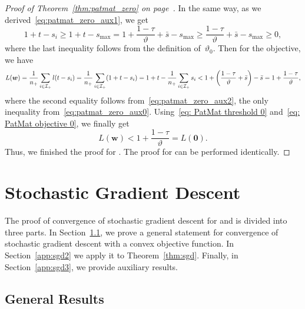 \begin{proof}[Proof of Theorem~\ref{thm:patmat_zero} on page~\pageref{thm:patmat_zero}]
  In the same way, as we derived~\eqref{eq:patmat_zero_aux1}, we get
  \begin{equation}\label{eq:patmat_zero_aux2}
    1 + t - s_i
    \geq 1 + t-s_{\max}
    =   1 + \frac{1-\tau}{\vartheta} + \bar{s} - s_{\max}
    \geq \frac{1-\tau}{\vartheta} + \bar{s} - s_{\max}
    \geq 0,
  \end{equation}
  where the last inequality follows from the definition of~$\vartheta_0$. Then for the objective, we have
  \begin{equation*}
    L(\bm{w})
      = \frac{1}{\npos}\sum_{i \in \Ipos}l(t-s_i)
      = \frac{1}{\npos}\sum_{i \in \Ipos}\Brac{1+t-s_i}
      = 1 + t - \frac{1}{\npos}\sum_{i \in \Ipos} s_i
      < 1 + \Brac{\frac{1 - \tau}{\vartheta} + \bar{s}} - \bar{s}
      = 1 + \frac{1-\tau}{\vartheta},  
  \end{equation*}
  where the second equality follows from~\eqref{eq:patmat_zero_aux2}, the only inequality from~\eqref{eq:patmat_zero_aux0}. Using~\eqref{eq: PatMat threshold 0} and~\eqref{eq: PatMat objective 0}, we finally get
  \begin{equation*}
    L(\bm{w})
      < 1 + \frac{1-\tau}{\vartheta}
      = L(\bm{0}).
  \end{equation*}
  Thus, we finished the proof for \PatMat. The proof for \PatMatNP can be performed identically.
\end{proof}

\section{Stochastic Gradient Descent}

The proof of convergence of stochastic gradient descent for \PatMat and \PatMatNP is divided into three parts. In Section~\ref{app:sgd1}, we prove a general statement for convergence of stochastic gradient descent with a convex objective function. In Section~\ref{app:sgd2} we apply it to Theorem~\ref{thm:sgd}. Finally, in Section~\ref{app:sgd3}, we provide auxiliary results.

\subsection{General Results}\label{app:sgd1}

